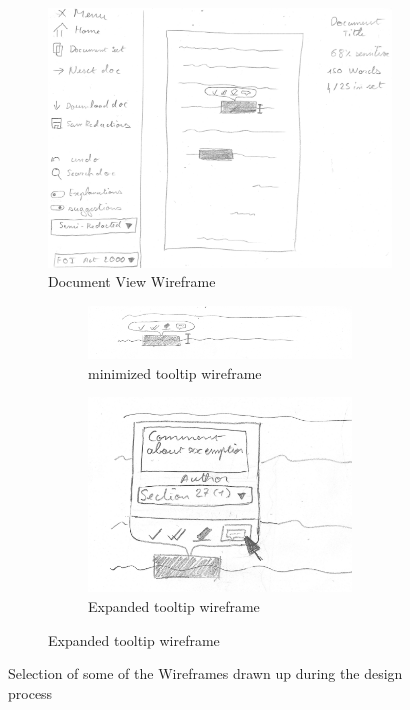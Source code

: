 \documentclass[\version]{l4proj}
\begin{document}
\begin{figure}[H]
    \centering
    \begin{subfigure}[b]{\linewidth}
        \centering
        \includegraphics[width=0.5\linewidth]{images/wireframes/doc_view.jpg}
        \caption{Document View Wireframe}\label{fig:document-wireframe}
    \end{subfigure}
    \begin{subfigure}[b]{\linewidth}
        \begin{subfigure}[b]{0.59\linewidth}
            \includegraphics[width=\linewidth]{images/wireframes/tooltip.jpg}
            \caption{minimized tooltip wireframe}\label{fig:tooltip-wireframe}
        \end{subfigure}
        \begin{subfigure}[b]{0.2\linewidth}
            \includegraphics[width=\linewidth]{images/wireframes/tooltip_comment.jpg}
            \caption{Expanded tooltip wireframe}\label{fig:expanded-tooltip-wireframe}
        \end{subfigure}
    \end{subfigure}
    \caption{Selection of some of the Wireframes drawn up during the design process}\label{fig:wireframes}

\end{figure}
\end{document}
